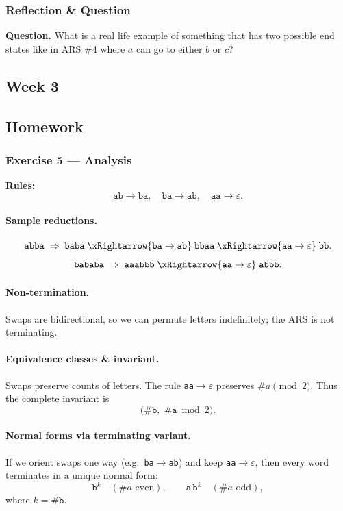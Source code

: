 \documentclass{article}
\theoremstyle{theorem}
\theoremstyle{definition}
\theoremstyle{remark}
\begin{document}
\subsubsection*{Reflection \& Question}
\textbf{Question.} What is a real life example of something that has two possible end states like in ARS \#4 where $a$ can go to either $b$ or $c$?

\subsection{Week 3}\label{sec:week3}
\smallskip

\subsection*{Homework}

\subsubsection*{Exercise 5 — Analysis}
\textbf{Rules:}
\[
\texttt{ab}\to\texttt{ba},\quad \texttt{ba}\to\texttt{ab},\quad \texttt{aa}\to\varepsilon.
\]

\paragraph{Sample reductions.}
\[
\texttt{abba}\;\Rightarrow\;\texttt{baba}\;\xRightarrow{\texttt{ba}\to\texttt{ab}}\;\texttt{bbaa}\;\xRightarrow{\texttt{aa}\to\varepsilon}\;\texttt{bb}.
\]
\[
\texttt{bababa}\;\Rightarrow\;\texttt{aaabbb}\;\xRightarrow{\texttt{aa}\to\varepsilon}\;\texttt{abbb}.
\]

\paragraph{Non-termination.}
Swaps are bidirectional, so we can permute letters indefinitely; the ARS is not terminating.

\paragraph{Equivalence classes \& invariant.}
Swaps preserve counts of letters. The rule \texttt{aa}$\to\varepsilon$ preserves \(\#a \pmod 2\).  
Thus the complete invariant is
\[
\big(\#\texttt{b},\;\#\texttt{a}\bmod 2\big).
\]

\paragraph{Normal forms via terminating variant.}
If we orient swaps one way (e.g.\ \texttt{ba}$\to$\texttt{ab}) and keep \texttt{aa}$\to\varepsilon$, then every word terminates in a unique normal form:
\[
\texttt{b}^k \quad(\#a \text{ even}), \qquad \texttt{a}\,\texttt{b}^k \quad(\#a \text{ odd}),
\]
where \(k=\#\texttt{b}\).
\end{document}
